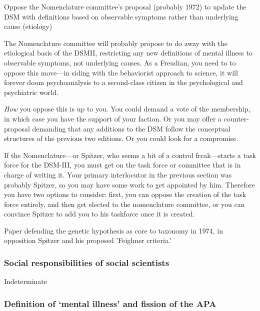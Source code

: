 \begin{refsection}
\begin{proposal}[Lief]\label{proposal:lief}Oppose the Nomenclature committee's proposal (probably 1972) to update the DSM with definitions based on observable symptoms rather than underlying cause (etiology)\end{proposal}

The Nomenclature committee will probably propose to do away with the etiological basis of the DSMII, restricting any new definitions of mental illness to observable symptoms, not underlying causes. As a Freudian, you need to to oppose this move---in siding with the behaviorist approach to science, it will forever doom psychoanalysis to a second-class citizen in the psychological and psychiatric world.

\emph{How} you oppose this is up to you. You could demand a vote of the membership, in which case you have the support of your faction. Or you may offer a counter-proposal demanding that any additions to the DSM follow the conceptual structures of the previous two editions. Or you could look for a compromise. 

If the Nomenclature---or Spitzer, who seems a bit of a control freak---starts a task force for the DSM-III, you must get on the task force or committee that is in charge of writing it. Your primary interlocutor in the previous section was probably Spitzer, so you may have some work to get appointed by him. Therefore you have two options to consider: first, you can oppose the creation of the task force entirely, and then get elected to the nomenclature committee, or you can convince Spitzer to add you to his taskforce once it is created.\begin{writingtask}[Leif]\label{writingtask:leif}
Paper defending the genetic hypothesis as core to taxonomy in 1974, in opposition Spitzer and his proposed 'Feighner criteria.'
\end{writingtask}

\subsubsection{Social responsibilities of social scientists}
\label{socialresponsibilitiesofsocialscientists}

Indeterminate

\subsubsection{Definition of ‘mental illness’ and fission of the APA}
\label{definitionof‘mentalillness’andfissionoftheapa}


\end{refsection}
